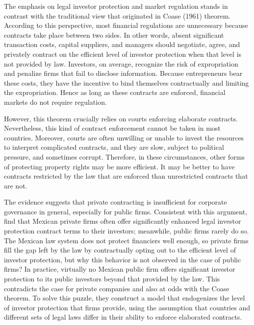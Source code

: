 \documentclass[final,1p,authoryear]{elsarticle}
\begin{document}
The emphasis on legal investor protection and market regulation stands in contrast with the traditional view that originated in Coase (1961) theorem. According to this perspective, most financial regulations are unnecessary because contracts take place between two sides. In other words, absent significant transaction costs, capital suppliers, and managers should negotiate, agree, and privately contract on the efficient level of investor protection when that level is not provided by law. Investors, on average, recognize the risk of expropriation and penalize firms that fail to disclose information. Because entrepreneurs bear these costs, they have the incentive to bind themselves contractually and limiting the expropriation. Hence as long as these contracts are enforced, financial markets do not require regulation.

However, this theorem crucially relies on courts enforcing elaborate contracts. Nevertheless, this kind of contract enforcement cannot be taken in most countries. Moreover, courts are often unwilling or unable to invest the resources to interpret complicated contracts, and they are slow, subject to political pressure, and sometimes corrupt. Therefore, in these circumstances, other forms of protecting property rights may be more efficient. It may be better to have contracts restricted by the law that are enforced than unrestricted contracts that are not.

The evidence suggests that private contracting is insufficient for corporate governance in general, especially for public firms. Consistent with this argument, \cite{RePEc:eee:jfinec:v:84:y:2007:i:3:p:738-771} find that Mexican private firms often offer significantly enhanced legal investor protection contract terms to their investors; meanwhile, public firms rarely do so. The Mexican law system does not protect financiers well enough, so private firms fill the gap left by the law by contractually opting out to the efficient level of investor protection, but why this behavior is not observed in the case of public firms? In practice, virtually no Mexican public firm offers significant investor protection to its public investors beyond that provided by the law. This contradicts the case for private companies and also at odds with the Coase theorem. To solve this puzzle, they construct a model that endogenizes the level of investor protection that firms provide, using the assumption that countries and different sets of legal laws differ in their ability to enforce elaborated contracts.
\end{document}
